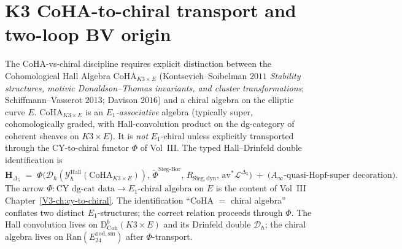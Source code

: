 \section{K3 CoHA-to-chiral transport and two-loop BV origin}
\label{sec:htpo-costello-supplement}

\begin{remark}
\label{rem:htpo-coha-not-chiral}
The CoHA-vs-chiral discipline requires explicit distinction between the
Cohomological Hall Algebra $\mathrm{CoHA}_{K3\times E}$
(Kontsevich--Soibelman $2011$ \emph{Stability structures, motivic
Donaldson--Thomas invariants, and cluster transformations};
Schiffmann--Vasserot $2013$; Davison $2016$) and a chiral algebra on
the elliptic curve $E$. $\mathrm{CoHA}_{K3\times E}$ is an
\emph{$E_1$-associative} algebra (typically super, cohomologically
graded, with Hall-convolution product on the dg-category of coherent
sheaves on $K3\times E$). It is \emph{not} $E_1$-chiral unless
explicitly transported through the CY-to-chiral functor $\Phi$ of
Vol~III. The typed Hall--Drinfeld double identification is
\[
 \mathbf{H}_{\Delta_5}
 \;=\;
 \Phi\bigl(\mathcal{D}_\hbar(\mathcal{Y}^{\mathrm{Hall}}_\hbar(\mathrm{CoHA}_{K3\times E})),\,
 \widetilde{\Phi}^{\mathrm{Sieg\text{-}Bor}},\,
 R_{\mathrm{Sieg,dyn}},\,
 \mathrm{av}^*\mathcal{L}^{\Delta_5}\bigr)
 \;+\; \text{($A_\infty$-quasi-Hopf-super decoration)}.
\]
The arrow $\Phi\colon \text{CY dg-cat data} \to \text{$E_1$-chiral
algebra on $E$}$ is the content of Vol~III
Chapter~\ref{V3-ch:cy-to-chiral}. The identification ``CoHA $=$ chiral
algebra'' conflates two distinct $E_1$-structures; the correct relation
proceeds through $\Phi$. The Hall convolution lives on
$\mathrm{D}^b_{\mathrm{Coh}}(K3\times E)$ and its Drinfeld double
$\mathcal{D}_\hbar$; the chiral algebra lives on
$\mathrm{Ran}(E^{\mathrm{nod,sm}}_{24})$ after $\Phi$-transport.
\end{remark}

